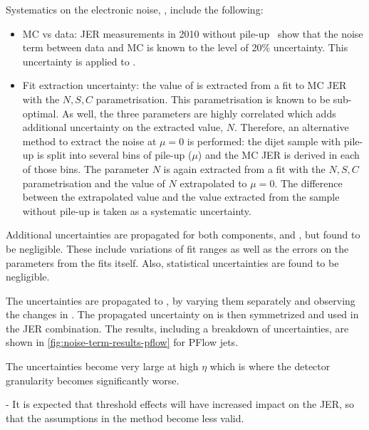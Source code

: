 Systematics on the electronic noise, \Nmuzero, include the following:
\begin{itemize}
    \item MC vs data: JER measurements in 2010 without pile-up~\cite{PERF-2011-04} show that the noise term between data and MC is known to the level of 20\% uncertainty. This uncertainty is applied to \Nmuzero.
    \item Fit extraction uncertainty: the value of \Nmuzero is extracted from a fit to MC JER with the $N, S, C$ parametrisation. This parametrisation is known to be sub-optimal. As well, the three parameters are highly correlated which adds additional uncertainty on the extracted value, $N$. Therefore, an alternative method to extract the noise at $\mu=0$ is performed: the dijet sample with pile-up is split into several bins of pile-up ($\mu$) and the MC JER is derived in each of those bins. The parameter $N$ is again extracted from a fit with the $N, S, C$ parametrisation and the value of $N$ extrapolated to $\mu=0$. The difference between the extrapolated value and the value extracted from the sample without pile-up is taken as a systematic uncertainty.
\end{itemize}

Additional uncertainties are propagated for both components, \Npileup and \Nmuzero, but found to be negligible. These include variations of fit ranges as well as the errors on the parameters from the fits itself. Also, statistical uncertainties are found to be negligible. 

The uncertainties are propagated to \Nfull, by varying them separately and observing the changes in \Nfull. The propagated uncertainty on \Nfull is then symmetrized and used in the JER combination. 
The results, including a breakdown of uncertainties, are shown in \cref{fig:noise-term-results-pflow} for PFlow jets.


%

The uncertainties become very large at high $\eta$ which is where the detector granularity becomes significantly worse.

- It is expected that threshold effects will have increased impact on the JER, so that the assumptions in the method become less valid. 

